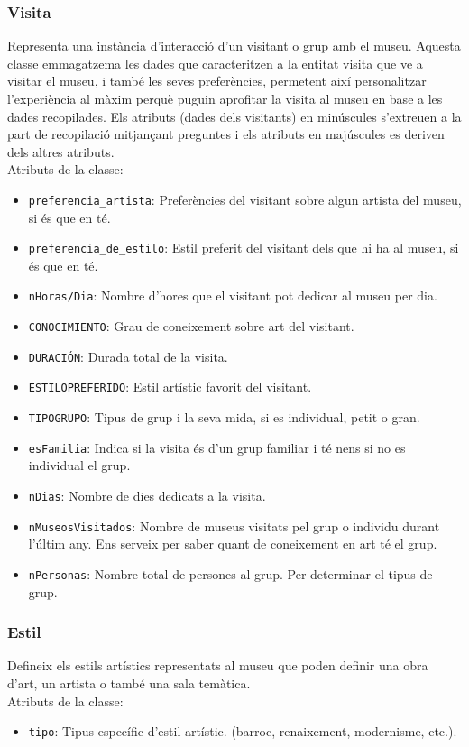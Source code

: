 \documentclass[a4paper]{article}
\begin{document}
	\subsubsection*{Visita}
	Representa una instància d'interacció d'un visitant o grup amb el museu. Aquesta classe emmagatzema les dades que caracteritzen a la entitat visita que ve a visitar el museu, i també les seves preferències, permetent així personalitzar l'experiència al màxim perquè puguin aprofitar la visita al museu en base a les dades recopilades. Els atributs (dades dels visitants) en minúscules s'extreuen a la part de recopilació mitjançant preguntes i els atributs en majúscules es deriven dels altres atributs.\\
	Atributs de la classe:
	\begin{itemize}
		\item \texttt{preferencia\_artista}: Preferències del visitant sobre algun artista del museu, si és que en té.
	 	\item \texttt{preferencia\_de\_estilo}: Estil preferit del visitant dels que hi ha al museu, si és que en té.
		\item \texttt{nHoras/Dia}: Nombre d’hores que el visitant pot dedicar al museu per dia.
		\item \texttt{CONOCIMIENTO}: Grau de coneixement sobre art del visitant.
		\item \texttt{DURACIÓN}: Durada total de la visita.
		\item \texttt{ESTILOPREFERIDO}: Estil artístic favorit del visitant.
		\item \texttt{TIPOGRUPO}: Tipus de grup i la seva mida, si es individual, petit o gran.
		\item \texttt{esFamilia}: Indica si la visita és d’un grup familiar i té nens si no es individual el grup.
		\item \texttt{nDias}: Nombre de dies dedicats a la visita.
		\item \texttt{nMuseosVisitados}: Nombre de museus visitats pel grup o individu durant l'últim any. Ens serveix per saber quant de coneixement en art té el grup.
	 	\item \texttt{nPersonas}: Nombre total de persones al grup. Per determinar el tipus de grup.
	\end{itemize}

	
	\subsubsection*{Estil}
	Defineix els estils artístics representats al museu que poden definir una obra d'art, un artista o també una sala temàtica.\\
	Atributs de la classe:
	\begin{itemize}
		\item \texttt{tipo}: Tipus específic d’estil artístic. (barroc, renaixement, modernisme, etc.).
	\end{itemize}
	
\end{document}
